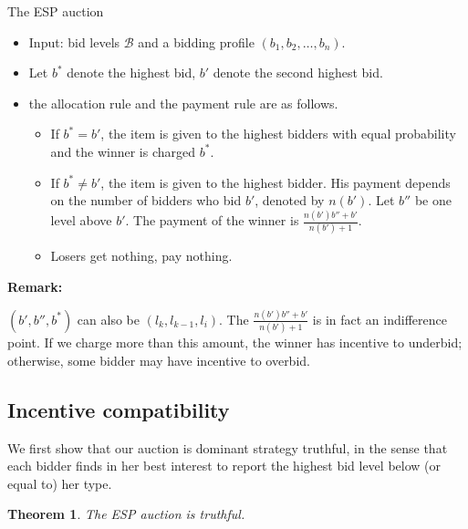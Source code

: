 \documentclass[letterpaper]{article}
\newtheorem{theorem}{Theorem}%
\begin{document}
\begin{algorithm}
	\caption{The ESP auction}
	\begin{itemize}
		\item Input: bid levels $\mathcal{B}$ and a bidding profile $(b_1,b_2,\ldots,b_n)$.
		\item Let $b^*$ denote the highest bid, $b'$ denote the second highest bid.
		\item the allocation rule and the payment rule are as follows.
		\begin{itemize}
			\item If $b^*=b'$, the item is given to the highest bidders with equal probability and the winner is charged $b^*$.
			\item If $b^*\neq b'$, the item is given to the highest bidder. His payment depends on the number of bidders who bid $b'$, denoted by $n(b')$. Let $b''$ be one level above $b'$. The payment of the winner is $\frac{n(b')b''+b'}{n(b')+1}$.
			\item Losers get nothing, pay nothing.
		\end{itemize}
	\end{itemize}
\end{algorithm}
\textbf{Remark:}

$(b',b'',b^*)$ can also be $(l_k,l_{k-1},l_i)$.
The $\frac{n(b')b''+b'}{n(b')+1}$ is in fact an indifference point.
If we charge more than this amount, the winner has incentive to underbid; otherwise, some bidder may have incentive to overbid.
\subsection{Incentive compatibility}

We first show that our auction is dominant strategy truthful, in the sense that each bidder finds in her best interest to report the highest bid level below (or equal to) her type.

\begin{theorem}
	The ESP auction is truthful.
\end{theorem}
\end{document}
